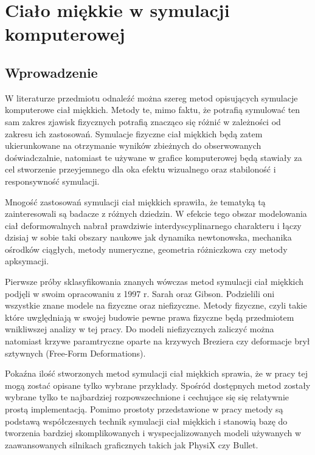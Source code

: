 \chapter{Ciało miękkie w symulacji komputerowej}

\section{Wprowadzenie}

W literaturze przedmiotu odnaleźć można szereg metod opisujących symulacje komputerowe ciał
miękkich. Metody te, mimo faktu, że potrafią symulować ten sam zakres zjawisk
fizycznych potrafią znacząco się różnić w zależności od zakresu ich zastosowań.
Symulacje fizyczne ciał miękkich będą zatem ukierunkowane na otrzymanie wyników
zbieżnych do obserwowanych doświadczalnie, natomiast te używane w grafice
komputerowej będą stawiały za cel stworzenie przeyjemnego dla oka efektu
wizualnego oraz stabiloność i responsywność symulacji.

Mnogość zastosowań symulacji ciał miękkich sprawiła, że tematyką tą
zainteresowali są badacze z różnych dziedzin. W efekcie tego obszar modelowania ciał
deformowalnych nabrał prawdziwie interdyscyplinarnego charakteru i łączy dzisiaj w sobie
taki obszary naukowe jak dynamika newtonowska, mechanika ośrodków ciągłych,
metody numeryczne, geometria różniczkowa czy metody apksymacji\cite{pbdo}.

Pierwsze próby sklasyfikowania znanych wówczas metod symulacji ciał miękkich
podjęli w swoim opracowaniu z 1997 r. Sarah oraz Gibson\cite{survey}. Podzielili
oni wszystkie znane modele na fizyczne oraz niefizyczne. Metody fizyczne, czyli
takie które uwględniają w swojej budowie pewne prawa fizyczne będą przedmiotem
wnikliwszej analizy w tej pracy. Do modeli niefizycznych zaliczyć można natomiast
krzywe paramtryczne oparte na krzywych Breziera czy deformacje brył sztywnych (Free-Form Deformations).\cite{pbdo}

Pokaźna ilość stworzonych metod symulacji ciał miękkich sprawia, że w pracy tej mogą zostać
opisane tylko wybrane przykłady. Spośród dostępnych metod zostały wybrane tylko 
te najbardziej rozpowszechnione i cechujące się się
relatywnie prostą implementacją. Pomimo prostoty przedstawione w pracy
metody są podstawą współczesnych technik symulacji ciał
miękkich i stanowią bazę do tworzenia bardziej skomplikowanych i 
wyspecjalizowanych modeli używanych w zaawansowanych silnikach graficznych
takich jak PhysiX czy Bullet.


